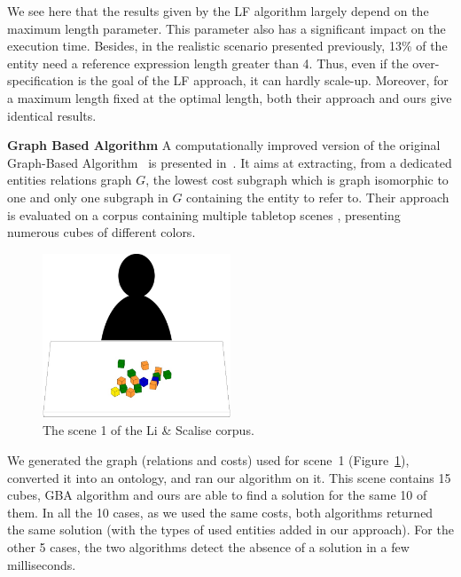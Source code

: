 \documentclass[a4paper,11pt,twoside]{StyleThese}
\begin{document}
We see here that the results given by the LF algorithm largely depend on the maximum length parameter. This parameter also has a significant impact on the execution time. Besides, in the realistic scenario presented previously, 13\% of the entity need a reference expression length greater than 4. Thus, even if the over-specification is the goal of the LF approach, it can hardly scale-up. Moreover, for a maximum length fixed at the optimal length, both their approach and ours give identical results.

\textbf{Graph Based Algorithm}
A computationally improved version of the original Graph-Based Algorithm~\cite{viethen2013graphs} is presented in~\cite{li2017automatically}. It aims at extracting, from a dedicated entities relations graph $G$, the lowest cost subgraph which is graph isomorphic to one and only one subgraph in $G$ containing the entity to refer to.
Their approach is evaluated on a corpus containing multiple tabletop scenes \cite{scalise2018natural}, presenting numerous cubes of different colors.

\begin{figure}[hbtp]
\centering
\includegraphics[width=0.5\textwidth]{figures/chapter3/liscene1.png}
\caption{The scene 1 of the Li \& Scalise corpus.}
\label{fig:gbacorpus}
\end{figure}

We generated the graph (relations and costs) used for scene~1 (Figure~\ref{fig:gbacorpus}), converted it into an ontology, and ran our algorithm on it.
This scene contains 15 cubes, GBA algorithm and ours are able to find a solution for the same 10 of them. In all the 10 cases, as we used the same costs, both algorithms returned the same solution (with the types of used entities added in our approach). 
For the other 5 cases, the two algorithms detect the absence of a solution in a few milliseconds.
\end{document}
